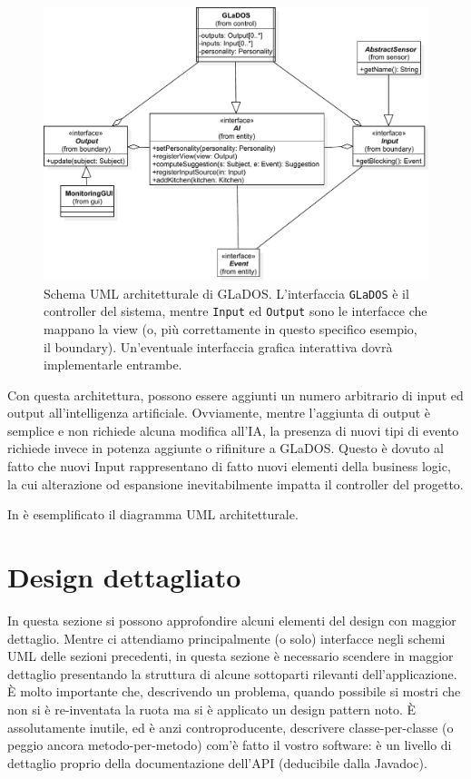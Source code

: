 \documentclass[a4paper,12pt]{report}
\begin{document}
\begin{figure}[h]
\centering{}
\includegraphics[width=\textwidth]{img/arch}
\caption{Schema UML architetturale di GLaDOS. L'interfaccia \texttt{GLaDOS} è il controller del sistema, mentre \texttt{Input} ed \texttt{Output} sono le interfacce che mappano la view (o, più correttamente in questo specifico esempio, il boundary). Un'eventuale interfaccia grafica interattiva dovrà implementarle entrambe.}
\label{img:goodarch}
\end{figure}

Con questa architettura, possono essere aggiunti un numero arbitrario di input ed output
all'intelligenza artificiale.
%
Ovviamente, mentre l'aggiunta di output è semplice e non richiede alcuna modifica all'IA, la
presenza di nuovi tipi di evento richiede invece in potenza aggiunte o rifiniture a GLaDOS.
%
Questo è dovuto al fatto che nuovi Input rappresentano di fatto nuovi elementi della business
logic, la cui alterazione od espansione inevitabilmente impatta il controller del progetto.

In  è esemplificato il diagramma UML architetturale.


\section{Design dettagliato}

In questa sezione si possono approfondire alcuni elementi del design con maggior dettaglio.
%
Mentre ci attendiamo principalmente (o solo) interfacce negli schemi UML delle sezioni precedenti, in questa sezione è necessario scendere in maggior dettaglio presentando la struttura di alcune sottoparti rilevanti dell'applicazione.
%
È molto importante che, descrivendo un problema, quando possibile si mostri che non si è re-inventata la ruota ma si è applicato un design pattern noto.
%
È assolutamente inutile, ed è anzi controproducente, descrivere classe-per-classe (o peggio ancora metodo-per-metodo) com'è fatto il vostro software: è un livello di dettaglio proprio della documentazione dell'API (deducibile dalla Javadoc).
\end{document}
